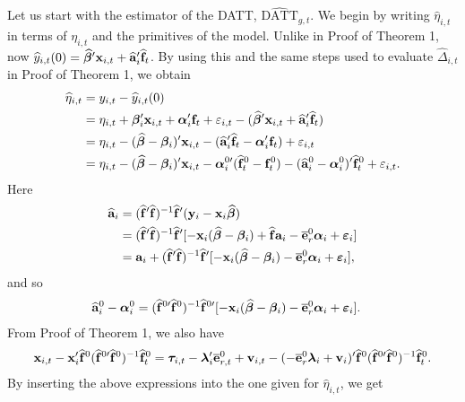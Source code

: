 \documentclass[12pt,fleqn]{article}
\begin{document}
Let us start with the estimator of the DATT, $\widehat{\mathrm{DATT}}_{g,t}$. We begin by writing $\widehat \eta_{i,t}$ in terms of $\eta_{i,t}$ and the primitives of the model. Unlike in Proof of Theorem 1, now $\widehat y_{i,t}(0) = \widehat{\boldsymbol{\beta}}'\mathbf{x}_{i,t} + \widehat{\mathbf{a}}_i'\widehat{\mathbf{f}}_t$. By using this and the same steps used to evaluate $\widehat \Delta_{i,t}$ in Proof of Theorem 1, we obtain
\begin{align}
\widehat \eta_{i,t} & = y_{i,t} - \widehat y_{i,t}(0)  \notag\\
& = \eta_{i,t} + \boldsymbol{\beta}_i'\mathbf{x}_{i,t} + \boldsymbol{\alpha}_i'\mathbf{f}_t + \varepsilon_{i,t} -  (\widehat{\boldsymbol{\beta}}'\mathbf{x}_{i,t} +  \widehat{\mathbf{a}}_i'\widehat{\mathbf{f}}_t )  \notag\\
& = \eta_{i,t} - (\widehat{\boldsymbol{\beta}}-\boldsymbol{\beta}_i)'\mathbf{x}_{i,t} - (\widehat{\mathbf{a}}_i'\widehat{\mathbf{f}}_t - \boldsymbol{\alpha}_i'\mathbf{f}_t)  + \varepsilon_{i,t} \notag\\
& = \eta_{i,t} - (\widehat{\boldsymbol{\beta}}-\boldsymbol{\beta}_i)'\mathbf{x}_{i,t} - \boldsymbol{\alpha}_i^{0\prime}(\widehat{\mathbf{f}}_t^0-\mathbf{f}_t^0) - (\widehat{\mathbf{a}}_i^{0} - \boldsymbol{\alpha}_i^0)'\widehat{\mathbf{f}}_t^0 + \varepsilon_{i,t}.
\end{align}
Here
\begin{align}
\widehat{\mathbf{a}}_i &= (\widehat{\mathbf{f}}'\widehat{\mathbf{f}})^{-1}\widehat{\mathbf{f}}'(\mathbf{y}_{i} - \mathbf{x}_{i}\widehat{\boldsymbol{\beta}}) \notag\\
& = (\widehat{\mathbf{f}}'\widehat{\mathbf{f}})^{-1}\widehat{\mathbf{f}}'[- \mathbf{x}_{i}(\widehat{\boldsymbol{\beta}}-\boldsymbol{\beta}_i) + \widehat{\mathbf{f}} \mathbf{a}_i - \overline{\mathbf{e}}_{r}^0\boldsymbol{\alpha}_i +  \boldsymbol{\varepsilon}_{i}] \notag\\
& =  \mathbf{a}_i + (\widehat{\mathbf{f}}'\widehat{\mathbf{f}})^{-1}\widehat{\mathbf{f}}'[-\mathbf{x}_{i}(\widehat{\boldsymbol{\beta}}-\boldsymbol{\beta}_i) - \overline{\mathbf{e}}_{r}^0\boldsymbol{\alpha}_i +  \boldsymbol{\varepsilon}_{i} ],
\end{align}
and so
\begin{align}
\widehat{\mathbf{a}}_i^0 - \boldsymbol{\alpha}_i^0 & = (\widehat{\mathbf{f}}^{0\prime}\widehat{\mathbf{f}}^0)^{-1}\widehat{\mathbf{f}}^{0\prime}[-\mathbf{x}_{i}(\widehat{\boldsymbol{\beta}}-\boldsymbol{\beta}_i) - \overline{\mathbf{e}}_{r}^0\boldsymbol{\alpha}_i +  \boldsymbol{\varepsilon}_{i} ].
\end{align}
From Proof of Theorem 1, we also have
\begin{align}
\mathbf{x}_{i,t} -  \mathbf{x}_{i}' \widehat{\mathbf{f}}^{0}(\widehat{\mathbf{f}}^{0\prime}\widehat{\mathbf{f}}^0)^{-1}\widehat{\mathbf{f}}_t^0  = \boldsymbol{\tau}_{i,t}  - \boldsymbol{\lambda}_i'\overline{\mathbf{e}}_{r,t}^0  + \mathbf{v}_{i,t} -  ( - \overline{\mathbf{e}}_{r}^0\boldsymbol{\lambda}_i  + \mathbf{v}_i)' \widehat{\mathbf{f}}^{0}(\widehat{\mathbf{f}}^{0\prime}\widehat{\mathbf{f}}^0)^{-1}\widehat{\mathbf{f}}_t^0.
\end{align}
By inserting the above expressions into the one given for $\widehat \eta_{i,t}$, we get
\end{document}

